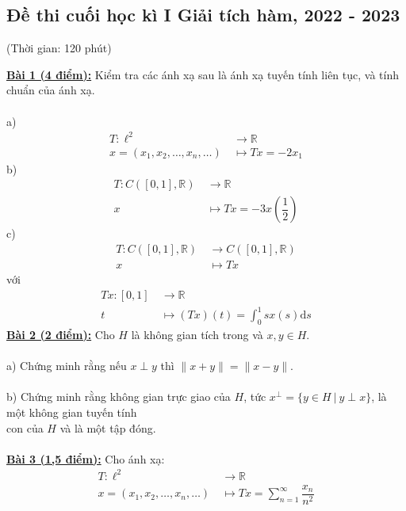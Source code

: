 \documentclass[10pt, a4paper]{article}
\begin{document}
\newpage

\subsection{Đề thi cuối học kì I Giải tích hàm, 2022 - 2023}
\begin{center}
	\color{blue}(Thời gian: 120 phút)
\end{center}
\color{red}\underline{\textbf{Bài 1 (4 điểm):}} \color{black}Kiểm tra các ánh xạ sau là ánh xạ tuyến tính liên tục, và tính chuẩn của ánh xạ.\\\\
\color{red}a) \color{black}\begin{align*}
	T:\ell^2~&\rightarrow\mathbb R\\
	x=(x_1,x_2,\dots,x_n,\dots)~&\mapsto Tx=-2x_1
\end{align*}
\color{red}b) \color{black}\begin{align*}
	T:C([0,1],\mathbb R)~&\rightarrow\mathbb R\\
	x~&\mapsto Tx=-3x\left(\dfrac12\right)
\end{align*}
\color{red}c) \color{black}\begin{align*}
	T:C([0,1],\mathbb R)~&\rightarrow C([0,1],\mathbb R)\\
	x~&\mapsto Tx
\end{align*}
với \begin{align*}
	Tx:[0,1]~&\rightarrow\mathbb R\\
	t~&\mapsto (Tx)(t)=\displaystyle\int_0^1sx(s)\text{d}s
\end{align*}
\color{red}\underline{\textbf{Bài 2 (2 điểm):}} \color{black}Cho $H$ là không gian tích trong và $x,y\in H$.\\\\
\color{red}a) \color{black}Chứng minh rằng nếu $x\perp y$ thì $\lVert x+y\rVert=\lVert x-y\rVert$.\\\\
\color{red}b) \color{black}Chứng minh rằng không gian trực giao của $H$, tức $x^\perp=\{y\in H~|~y\perp x\}$, là một không gian tuyến tính\\ con của $H$ và là một tập đóng.\\\\
\color{red}\underline{\textbf{Bài 3 (1,5 điểm):}} \color{black}Cho ánh xạ:\begin{align*}
	T:\ell^2~&\rightarrow\mathbb R\\
	x=(x_1,x_2,\dots,x_n,\dots)~&\mapsto Tx=\displaystyle\sum_{n=1}^\infty\dfrac{x_n}{n^2}
\end{align*}
\end{document}
